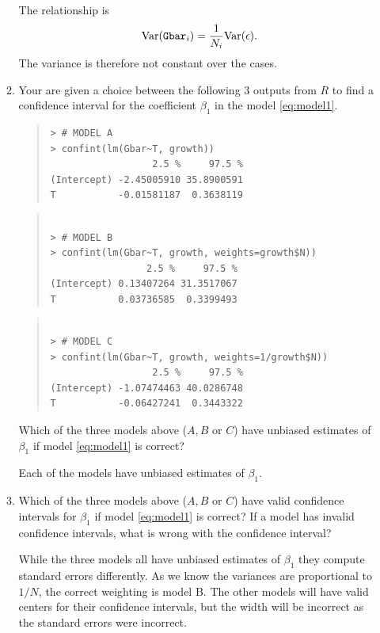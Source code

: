 \documentclass{article}
\begin{document}
\begin{enumerate}
\begin{enumerate}
{\color{red}
The relationship is
$$
\text{Var}({\tt Gbar}_i) = \frac{1}{N_i} \text{Var}(\epsilon).
$$
The variance is therefore not constant over the cases. }

\item Your are given a choice between the following 3 outputs from $R$ to
find a confidence interval for the coefficient $\beta_1$ in the model \eqref{eq:model1}.

\begin{quote}
\begin{verbatim}
> # MODEL A
> confint(lm(Gbar~T, growth))
                  2.5 %     97.5 %
(Intercept) -2.45005910 35.8900591
T           -0.01581187  0.3638119
\end{verbatim}
\end{quote}
\begin{quote}
\begin{verbatim}

> # MODEL B
> confint(lm(Gbar~T, growth, weights=growth$N))
                 2.5 %     97.5 %
(Intercept) 0.13407264 31.3517067
T           0.03736585  0.3399493

\end{verbatim}
\end{quote}
\begin{quote}
\begin{verbatim}

> # MODEL C
> confint(lm(Gbar~T, growth, weights=1/growth$N))
                  2.5 %     97.5 %
(Intercept) -1.07474463 40.0286748
T           -0.06427241  0.3443322

\end{verbatim}
\end{quote}

\newpage

Which of the three models above ($A,B$ or $C$) have unbiased estimates of $\beta_1$ if model \eqref{eq:model1} is correct?

{\color{red}
Each of the models have unbiased estimates of $\beta_1$.
}


\item Which of the three models above ($A,B$ or $C$) have valid confidence intervals
for $\beta_1$ if model \eqref{eq:model1} is correct? If a model has invalid
confidence intervals, what is wrong with the confidence interval?

{\color{red}
While the three models all have unbiased estimates of $\beta_1$ they compute
standard errors differently. As we know the variances are proportional to $1/N$, 
the correct weighting is model B. The other models will have valid centers for their
confidence intervals, but the width will be incorrect as the standard errors were incorrect.
}
\end{enumerate}

\end{enumerate}
\end{document}

